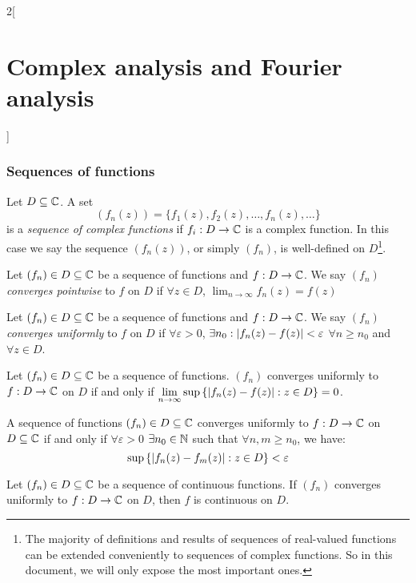 \documentclass[../../../main.tex]{subfiles}
\begin{document}
\begin{multicols}{2}[\section{Complex analysis and Fourier analysis}]
  \subsubsection{Sequences of functions}
  \begin{definition}
    Let $D\subseteq\mathbb{C}$. A set $$(f_n(z))=\{f_1(z),f_2(z),\ldots,f_n(z),\ldots\}$$ is a \emph{sequence of complex functions} if $f_i:D\rightarrow\mathbb{C} $ is a complex function. In this case we say the sequence $(f_n(z))$, or simply $(f_n)$, is well-defined on $D$\footnote{The majority of definitions and results of sequences of real-valued functions can be extended conveniently to sequences of complex functions. So in this document, we will only expose the most important ones.}.
  \end{definition}
  \begin{definition}
    Let $(f_n)\in D\subseteq\mathbb{C}$ be a sequence of functions and $f:D\rightarrow\mathbb{C}$. We say $(f_n)$ \emph{converges pointwise} to $f$ on $D$ if $\forall z\in D$, $\displaystyle\lim_{n\to\infty}f_n(z)=f(z)$
  \end{definition}
  \begin{definition}
    Let $(f_n)\in D\subseteq\mathbb{C}$ be a sequence of functions and $f:D\rightarrow\mathbb{C}$. We say $(f_n)$ \emph{converges uniformly} to $f$ on $D$ if $\forall\varepsilon>0$, $\exists n_0:\abs{f_n(z)-f(z)}<\varepsilon$ $\forall n\geq n_0$ and $\forall z\in D$.
  \end{definition}
  \begin{lemma}
    Let $(f_n)\in D\subseteq\mathbb{C}$ be a sequence of functions. $(f_n)$ converges uniformly to $f:D\rightarrow\mathbb{C}$ on $D$ if and only if $\displaystyle \lim_{n\to\infty}\sup\left\{\abs{f_n(z)-f(z)}:z\in D\right\}=0$.
  \end{lemma}
  \begin{theorem}
    A sequence of functions $(f_n)\in D\subseteq\mathbb{C}$ converges uniformly to $f:D\rightarrow\mathbb{C}$ on $D\subseteq\mathbb{C}$ if and only if $\forall\varepsilon>0$ $\exists n_0\in\mathbb{N}$ such that  $\forall n,m\geq n_0$, we have: $$\sup\left\{\abs{f_n(z)-f_m(z)}:z\in D\right\}< \varepsilon$$
  \end{theorem}
  \begin{theorem}
    Let $(f_n)\in D\subseteq\mathbb{C}$ be a sequence of continuous functions. If $(f_n)$ converges uniformly to $f:D\rightarrow\mathbb{C}$ on $D$, then $f$ is continuous on $D$.
  \end{theorem}

\end{multicols}
\end{document}

